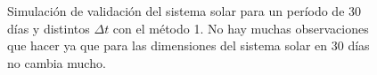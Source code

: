 \begin{figure}
{	\label{fig:ej2_m1_30_12}
	}
	\caption{
		Simulación de validación del sistema solar para un período de 30 días y distintos $\Delta t$
		con el método 1.
		No hay muchas observaciones que hacer ya que para las dimensiones del sistema solar en 30 días no cambia mucho.
	}
	\label{ fig:res_ej2_m1_30 }
\end{figure}
